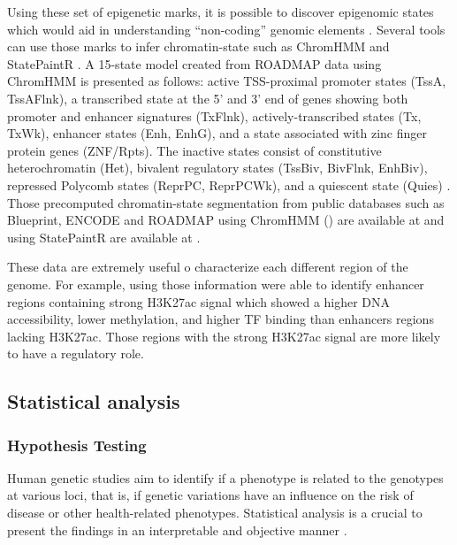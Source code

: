 Using these set of epigenetic marks, it is possible to
 discover epigenomic states which would aid in understanding
 “non-coding” genomic elements \cite{statepaintr}.
 Several tools can use those marks to infer chromatin-state such as ChromHMM \cite{ernst2012chromhmm} and StatePaintR \cite{statepaintr}.
A 15-state model created from ROADMAP data using ChromHMM is presented as follows: active TSS-proximal promoter states (TssA, TssAFlnk), a transcribed state at the 5’ and 3’ end of genes showing both promoter and enhancer signatures (TxFlnk), actively-transcribed states (Tx, TxWk), enhancer states (Enh, EnhG), and a state associated with zinc finger protein genes (ZNF/Rpts). The inactive states consist of constitutive heterochromatin (Het), bivalent regulatory states (TssBiv, BivFlnk, EnhBiv), repressed Polycomb states (ReprPC, ReprPCWk), and a quiescent state (Quies) \cite{kundaje2015integrative}.
Those precomputed chromatin-state segmentation from
 public databases such as Blueprint, ENCODE and ROADMAP using ChromHMM ()
 are available at  and
 using StatePaintR  are available at .

These data are extremely useful o characterize each different region of the genome.
For example, using those information  were able to identify enhancer regions
containing strong H3K27ac signal which showed a higher DNA accessibility,
lower methylation, and higher TF binding than enhancers regions lacking H3K27ac.
Those regions with the strong H3K27ac signal are more likely to have a regulatory role.

\subsection{Statistical analysis}

\subsubsection{Hypothesis Testing}

Human genetic studies aim to identify if a phenotype is related to the genotypes
at various loci, that is, if genetic variations have an influence on the risk of
disease or other health-related phenotypes.
Statistical analysis is a crucial to present the findings in an
interpretable and objective manner \cite{sham2014statistical}.

